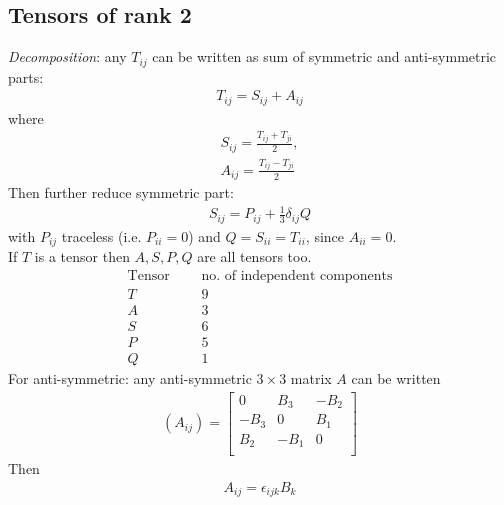 \documentclass[a4paper]{article}
\begin{document}
\subsection{Tensors of rank 2}
\emph{Decomposition}: any $T_{ij}$ can be written as sum of symmetric and anti-symmetric parts:
\begin{equation*}
\begin{aligned}
T_{ij} = S_{ij} + A_{ij}
\end{aligned}
\end{equation*}
where
\begin{equation*}
\begin{aligned}
S_{ij} = \frac{T_{ij} + T_{ji}}{2},\\
A_{ij} = \frac{T_{ij} - T_{ji}}{2}
\end{aligned}
\end{equation*}
Then further reduce symmetric part:
\begin{equation*}
\begin{aligned}
S_{ij} = P_{ij} + \frac{1}{3}\delta_{ij} Q
\end{aligned}
\end{equation*}
with $P_{ij}$ traceless (i.e. $P_{ii} = 0$) and $Q=S_{ii} = T_{ii}$, since $A_{ii} = 0$.\\
If $T$ is a tensor then $A,S,P,Q$ are all tensors too.\\
\begin{equation*}
\begin{aligned}
\text{Tensor} & \text{          } & \text{no. of independent components}\\
T & & 9\\
A & & 3\\
S & & 6\\
P & & 5\\
Q & & 1
\end{aligned}
\end{equation*}
For anti-symmetric: any anti-symmetric $3\times 3$ matrix $A$ can be written
\begin{equation*}
\begin{aligned}
\left(A_{ij}\right) = \left[
\begin{matrix}
0 & B_3 & -B_2 \\
-B_3 & 0 & B_1 \\
B_2 & -B_1 & 0 \\
\end{matrix}\right]
\end{aligned}
\end{equation*}
Then 
\begin{equation*}
\begin{aligned}
A_{ij} = \epsilon_{ijk} B_k
\end{aligned}
\end{equation*}
\end{document}
